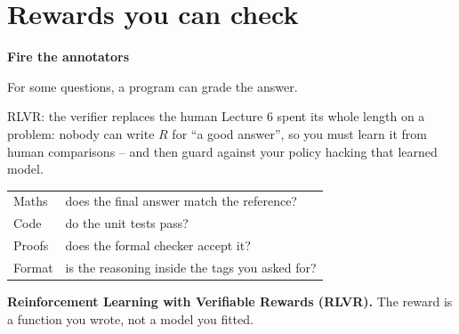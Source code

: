 \documentclass[aspectratio=169]{beamer}
\begin{document}
\section{Rewards you can check}
\begin{frame}[plain]
  \begin{center}
    \vskip 1.6cm
    {\Huge\bfseries\color{popblue}Fire the annotators}

    \vskip 0.6cm
    {\large For some questions, a program can grade the answer.}
  \end{center}
\end{frame}

\begin{frame}{RLVR: the verifier replaces the human}
  \small
  Lecture 6 spent its whole length on a problem: nobody can write $R$ for ``a good answer'', so
  you must learn it from human comparisons -- and then guard against your policy hacking that
  learned model.

  \vskip 8pt
  \begin{tcolorbox}[colback=paramgreen!8, colframe=paramgreen, boxrule=0.8pt, arc=2pt,
                    title={\textbf{But for some questions, correctness is checkable}}]
    \small
    \begin{center}
    \begin{tabular}{l l}
      Maths & does the final answer match the reference? \\
      Code & do the unit tests pass? \\
      Proofs & does the formal checker accept it? \\
      Format & is the reasoning inside the tags you asked for? \\
    \end{tabular}
    \end{center}
  \end{tcolorbox}

  \vskip 6pt
  \begin{center}
    \small
    \textbf{Reinforcement Learning with Verifiable Rewards (RLVR).} The reward is a function you
    wrote, not a model you fitted.
  \end{center}
\end{frame}
\end{document}

